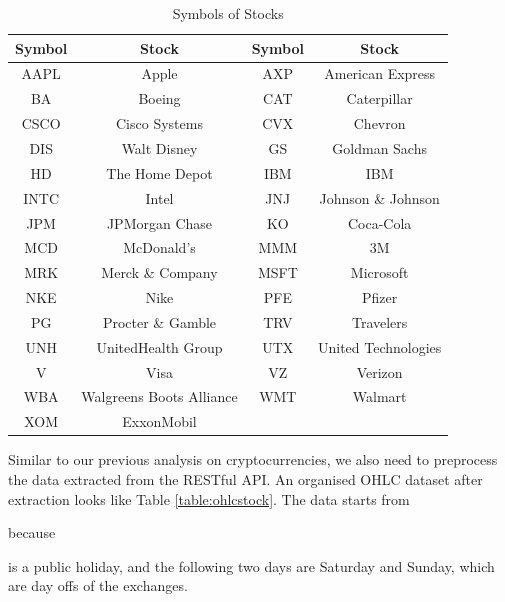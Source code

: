 \documentclass[11pt]{article} %
\theoremstyle{plain}
\theoremstyle{definition}
\begin{document}
{
  \begin{table}[ht]
    \centering
    \small
    \begin{tabular}{|c|c|c|c|}
        \hline
        Symbol & Stock & Symbol & Stock \\
        \hline
        AAPL & Apple & AXP & American Express \\
        BA & Boeing & CAT & Caterpillar \\
        CSCO & Cisco Systems & CVX & Chevron \\
        DIS & Walt Disney & GS & Goldman Sachs \\
        HD & The Home Depot & IBM & IBM \\
        INTC & Intel & JNJ & Johnson \& Johnson \\
        JPM & JPMorgan Chase & KO & Coca-Cola \\
        MCD & McDonald's & MMM & 3M \\
        MRK & Merck \& Company & MSFT & Microsoft \\
        NKE & Nike & PFE & Pfizer \\
        PG & Procter \& Gamble & TRV & Travelers \\
        UNH & UnitedHealth Group & UTX & United Technologies \\
        V & Visa & VZ & Verizon \\
        WBA & Walgreens Boots Alliance & WMT & Walmart \\
        XOM & ExxonMobil & & \\
        \hline
    \end{tabular}
    \caption{Symbols of Stocks}
    \label{table:symbolstock}
  \end{table}
}

Similar to our previous analysis on cryptocurrencies, we also need to preprocess the data extracted from the RESTful API. An organised OHLC dataset after extraction looks like Table \ref{table:ohlcstock}. The data starts from \date{4th January 2016} because \date{1st January 2016} is a public holiday, and the following two days are Saturday and Sunday, which are day offs of the exchanges.
\end{document}
